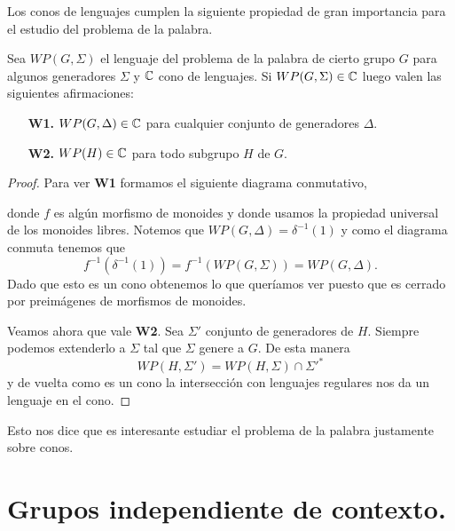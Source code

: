 \documentclass[tesis.tex]{subfiles}
\begin{document}
Los conos de lenguajes cumplen la siguiente propiedad de gran importancia para el estudio del problema de la palabra.
\medskip
\begin{prop}\label{prop-cono-wp}
	Sea $WP(G, \Sigma)$ el lenguaje del problema de la palabra de cierto grupo $G$ para algunos generadores $\Sigma$ y $\mathbb{C}$ cono de lenguajes. 
	Si $WP(G, \Sigma) \in \mathbb{C}$ luego valen las siguientes afirmaciones:
	\begin{itemize}
		\item[\textbf{W1.}] $WP(G, \Delta) \in \mathbb{C}$ para cualquier conjunto de generadores $\Delta$.
		\item[\textbf{W2.}] $WP(H) \in \mathbb{C}$ para todo subgrupo $H$ \fg de $G$.
	\end{itemize} 
\end{prop}
\begin{proof}
		Para ver \textbf{W1} formamos el siguiente diagrama conmutativo,
		\begin{center}
		\end{center}
		donde $f$ es algún morfismo de monoides y donde usamos la propiedad universal de los monoides libres.
		Notemos que $WP(G, \Delta) = \delta^{-1}(1)$ y como el diagrama conmuta tenemos que 
		\[
		f^{-1}(\delta^{-1}(1)) = f^{-1}(WP(G,\Sigma)) = WP(G, \Delta).
		\]
		Dado que esto es un cono obtenemos lo que queríamos ver puesto que es cerrado por preimágenes de morfismos de monoides.
		
		
		
		Veamos ahora que vale \textbf{W2}. 
		Sea $\Sigma'$ conjunto de generadores de $H$.
		Siempre podemos extenderlo a $\Sigma$ tal que $\Sigma$ genere a $G$. 
		De esta manera 
		\[
		WP(H, \Sigma') = WP(H, \Sigma) \cap \Sigma'^*
		\]
		y de vuelta como es un cono la intersección con lenguajes regulares nos da un lenguaje en el cono. 

\end{proof}


Esto nos dice que es interesante estudiar el problema de la palabra justamente sobre conos.

\section{Grupos independiente de contexto.}
\end{document}
